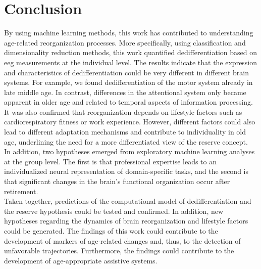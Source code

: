 \section{Conclusion}
By using machine learning methods, this work has contributed to understanding age-related reorganization processes. More specifically, using classification and dimensionality reduction methods, this work quantified dedifferentiation based on \gls{eeg} measurements at the individual level. The results indicate that the expression and characteristics of dedifferentiation could be very different in different brain systems. For example, we found dedifferentiation of the motor system already in late middle age. In contrast, differences in the attentional system only became apparent in older age and related to temporal aspects of information processing. It was also confirmed that reorganization depends on lifestyle factors such as cardiorespiratory fitness or work experience. However, different factors could also lead to different adaptation mechanisms and contribute to individuality in old age, underlining the need for a more differentiated view of the reserve concept.\\
In addition, two hypotheses emerged from exploratory machine learning analyses at the group level. The first is that professional expertise leads to an individualized neural representation of domain-specific tasks, and the second is that significant changes in the brain's functional organization occur after retirement.\\
Taken together, predictions of the computational model of dedifferentiation and the reserve hypothesis could be tested and confirmed. In addition, new hypotheses regarding the dynamics of brain reorganization and lifestyle factors could be generated. The findings of this work could contribute to the development of markers of age-related changes and, thus, to the detection of unfavorable trajectories. Furthermore, the findings could contribute to the development of age-appropriate assistive systems.




